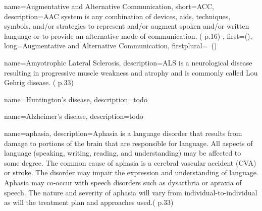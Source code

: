 {
	name={Augmentative and Alternative Communication}, 
	short={ACC},
	description={AAC system is any combination of devices, aids, techniques, symbols, and/or strategies to represent and/or augment spoken and/or written language or to provide an alternative mode of communication. (\cite{SLPathologies} p.16)
},
first={}(),
	long={Augmentative and Alternative Communication},
	firstplural={\glspluralsuffix\ (\glspluralsuffix )}
}

 {
	name={Amyotrophic Lateral Sclerosis}, 
	description={ALS is a neurological disease resulting in progressive muscle weakness and atrophy and is commonly called Lou Gehrig disease. (\cite{SLPathologies} p.33)
}%
}




 {
	name={Huntington's disease}, 
	description={todo}
}





 {
	name={Alzheimer's disease}, 
	description={todo}
}







 {
	name={aphasia}, 
	description={Aphasia is a language disorder that results from damage to portions of the brain that are responsible for language. All aspects of language (speaking, writing, reading, and understanding) may be affected to some degree. The common cause of aphasia is a cerebral vascular accident (CVA) or stroke. The disorder may impair the expression and understanding of language. Aphasia may co-occur with speech disorders such as dysarthria or apraxia of speech. The nature and severity of aphasia will vary from individual-to-individual as will the treatment plan and approaches used.(\cite{SLPathologies} p.33)
}
}


